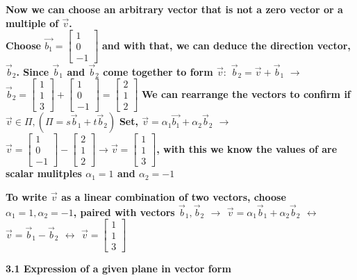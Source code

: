 \documentclass{article}
\begin{document}
\textbf{Now we can choose an arbitrary vector that is not a zero vector or a multiple of $\vec{v}$. \\ Choose 
	$\vec{b_{1}} =   \begin{bmatrix}
			1 \\
			0 \\
			-1
		\end{bmatrix}$}
\textbf{ and with that, we can deduce the direction vector, $\vec{b}_{2}$. Since $\vec{b}_{1}$ and $\vec{b}_{2}$ come together to form $\vec{v}:$} \textbf{$\vec{b}_{2} = \vec{v} + \vec{b}_{1}$}
\textbf{ $\rightarrow$ $\vec{b}_{2} = \begin{bmatrix}
		1 \\ 
		1 \\
		3
	\end{bmatrix} + \begin{bmatrix}
	1 \\
	0 \\ 
	-1
\end{bmatrix} = \begin{bmatrix}
2 \\
1 \\
2
\end{bmatrix}$}
\textbf{We can rearrange the vectors to confirm if $\vec{v} \in \Pi, (\Pi = s\vec{b}_{1} + t\vec{b}_{2})$}
\textbf{Set, $\vec{v} = \alpha_{{1}}\vec{b_{1}} + \alpha_{{2}}\vec{b}_{2}$ $\rightarrow$ $\vec{v} = \begin{bmatrix}
		1 \\
		0 \\
		-1
	\end{bmatrix} - \begin{bmatrix}
	 	2 \\
	 	1 \\ 
	 	2
	 \end{bmatrix} \rightarrow \vec{v} = \begin{bmatrix}
	 1 \\
	 1 \\ 
	 3 
	\end{bmatrix}$, with this we know the values of are scalar mulitples $\alpha_{1} = 1$ and $\alpha_{2} = -1 $}

\textbf{To write $\vec{v}$ as a linear combination of two vectors, choose $\alpha_{1} = 1, \alpha_{2} = -1$, paired with vectors $\vec{b}_{1}, \vec{b}_{2}$ $\rightarrow$ $\vec{v} = \alpha_{{1}}\vec{b}_{1} + \alpha_{{2}}\vec{b}_{2}$ $\leftrightarrow$ $\vec{v} = \vec{b}_{1} - \vec{b}_{2}$ $\leftrightarrow$ $\vec{v} = \begin{bmatrix}
		1 \\
		1 \\
		3
\end{bmatrix}$}
	
\clearpage
{}

\textbf{3.1 Expression of a given plane in vector form}

	
\end{document}
